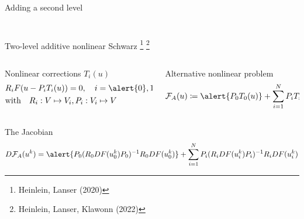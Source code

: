 \begin{frame}{Adding a second level}
{\begin{columns}
\begin{column}{0.4\textwidth}
\begin{figure}
				\end{figure}
			\end{column}
		\end{columns}
	}
\end{frame}

\begin{frame}{Two-level additive nonlinear Schwarz \footnote{\tiny Heinlein, Lanser (2020)} \footnote{\tiny Heinlein, Lanser, Klawonn (2022)}}
	\begin{columns}
		\begin{column}{0.5\textwidth}
			\begin{block}{\normalsize Nonlinear corrections $T_i(u)$}
				\vspace*{-1mm}
				\begin{align*}
					 & R_iF(u-P_iT_i(u))  = 0, \quad i = \alert{0},1,2,\dots N      \\
					 & \text{with}\quad R_i:V\mapsto V_i\text{,}\, P_i:V_i\mapsto V
				\end{align*}
			\end{block}
		\end{column}
		\begin{column}{0.5\textwidth}
			\begin{block}{\normalsize Alternative nonlinear problem}
				\begin{equation*}
					\mathcal{F}_A(u) \coloneqq \alert{P_0T_0(u)} + \sum_{i=1}^NP_iT_i(u) = 0
				\end{equation*}
			\end{block}
		\end{column}
	\end{columns}
	\begin{block}{\normalsize The Jacobian}
		\vspace*{-2mm}
		\begin{align*}
			D\mathcal{F}_A(u^k)  = \alert{P_0(R_0DF(u_0^k)P_0)^{-1}R_0DF(u_0^k)} + \sum_{i=1}^NP_i(R_iDF(u_i^k)P_i)^{-1}R_iDF(u_i^k)
		\end{align*}
	\end{block}
\end{frame}

